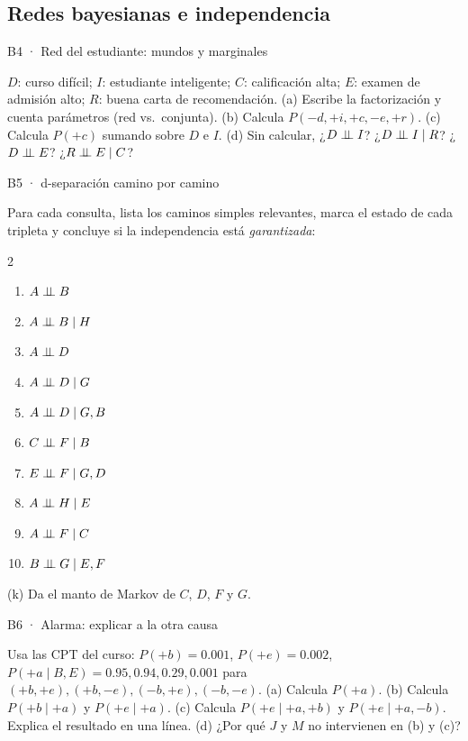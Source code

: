 \subsection{Redes bayesianas e independencia}

\begin{ejercicio}{B4 · Red del estudiante: mundos y marginales }
\begin{center}\figEst\qquad\tabEst\end{center}
$D$: curso difícil; $I$: estudiante inteligente; $C$: calificación alta; $E$: examen de admisión alto; $R$: buena carta de recomendación.
(a) Escribe la factorización y cuenta parámetros (red vs.\ conjunta).
(b) Calcula $P(-d,+i,+c,-e,+r)$.
(c) Calcula $P(+c)$ sumando sobre $D$ e $I$.
(d) Sin calcular, ¿$D\perp\!\!\!\perp I$? ¿$D\perp\!\!\!\perp I\mid R$? ¿$D\perp\!\!\!\perp E$? ¿$R\perp\!\!\!\perp E\mid C$?
\end{ejercicio}

\begin{ejercicio}{B5 · d-separación camino por camino }
\begin{center}\figDsep\end{center}
Para cada consulta, lista los caminos simples relevantes, marca el estado de cada tripleta y concluye si la
independencia está \emph{garantizada}:
\begin{multicols}{2}
\begin{enumerate}[label=(\alph*)]
\item $A\perp\!\!\!\perp B$
\item $A\perp\!\!\!\perp B\mid H$
\item $A\perp\!\!\!\perp D$
\item $A\perp\!\!\!\perp D\mid G$
\item $A\perp\!\!\!\perp D\mid G,B$
\item $C\perp\!\!\!\perp F\mid B$
\item $E\perp\!\!\!\perp F\mid G,D$
\item $A\perp\!\!\!\perp H\mid E$
\item $A\perp\!\!\!\perp F\mid C$
\item $B\perp\!\!\!\perp G\mid E,F$
\end{enumerate}
\end{multicols}
(k) Da el manto de Markov de $C$, $D$, $F$ y $G$.
\end{ejercicio}

\begin{ejercicio}{B6 · Alarma: explicar a la otra causa }
\begin{center}\figAlarma\end{center}
Usa las CPT del curso: $P(+b)=0.001$, $P(+e)=0.002$, $P(+a\mid B,E)=0.95,0.94,0.29,0.001$ para
$(+b,+e),(+b,-e),(-b,+e),(-b,-e)$.
(a) Calcula $P(+a)$. (b) Calcula $P(+b\mid+a)$ y $P(+e\mid+a)$.
(c) Calcula $P(+e\mid+a,+b)$ y $P(+e\mid+a,-b)$. Explica el resultado en una línea.
(d) ¿Por qué $J$ y $M$ no intervienen en (b) y (c)?
\end{ejercicio}

